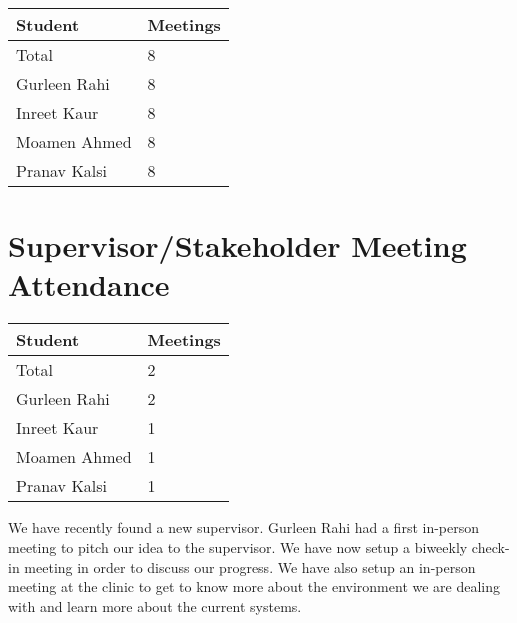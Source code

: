 \documentclass{article}
\begin{document}

\begin{table}[H]
\centering
\begin{tabular}{ll}
\toprule
\textbf{Student} & \textbf{Meetings}\\
\midrule
Total & 8\\
Gurleen Rahi & 8 \\
Inreet Kaur & 8 \\
Moamen Ahmed & 8 \\
Pranav Kalsi & 8 \\
\bottomrule
\end{tabular}
\end{table}


\section{Supervisor/Stakeholder Meeting Attendance}


\begin{table}[H]
\centering
\begin{tabular}{ll}
\toprule
\textbf{Student} & \textbf{Meetings}\\
\midrule
Total & 2 \\
Gurleen Rahi & 2\\
Inreet Kaur & 1\\
Moamen Ahmed & 1\\
Pranav Kalsi & 1\\
\bottomrule
\end{tabular}
\end{table}

We have recently found a new supervisor. Gurleen Rahi had a first in-person meeting to pitch our idea to the supervisor. We have now setup a biweekly check-in meeting in order to discuss our progress. We have also setup an in-person meeting at the clinic to get to know more about the environment we are dealing with and learn more about the current systems. 
\end{document}
